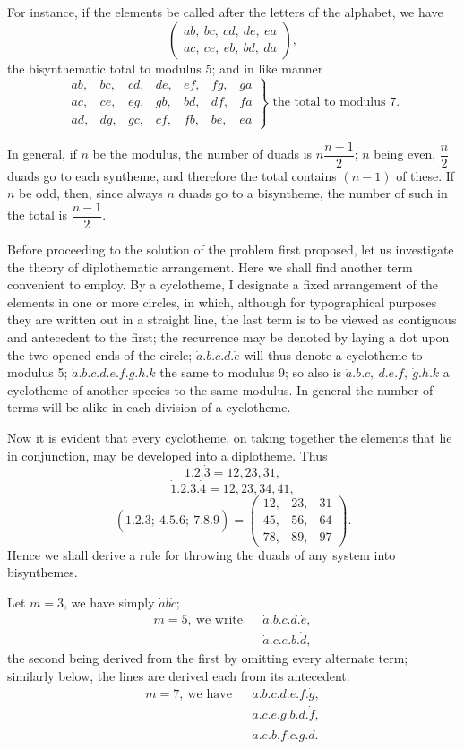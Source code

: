 \documentclass[11pt]{article}
\newcommand{\sourcepage}[1]{\marginpar{\scriptsize p.~#1}}
\newcommand{\dotter}[1]{\dot{#1}}
\newcommand{\tworow}[2]{\left(\begin{matrix}#1\\#2\end{matrix}\right)}
\begin{document}
For instance, if the elements be called after the letters of the alphabet, we have
\[
\tworow{ab,\ bc,\ cd,\ de,\ ea}{ac,\ ce,\ eb,\ bd,\ da},
\]
the bisynthematic total to modulus 5; and in like manner
\[
\left.\begin{array}{lllllll}
ab,&bc,&cd,&de,&ef,&fg,&ga\\
ac,&ce,&eg,&gb,&bd,&df,&fa\\
ad,&dg,&gc,&cf,&fb,&be,&ea
\end{array}\right\}\text{ the total to modulus }7.
\]

\sourcepage{93}
In general, if $n$ be the modulus, the number of duads is $n\dfrac{n-1}{2}$; $n$ being even, $\dfrac{n}{2}$ duads go to each syntheme, and therefore the total contains $(n-1)$ of these. If $n$ be odd, then, since always $n$ duads go to a bisyntheme, the number of such in the total is $\dfrac{n-1}{2}$.

Before proceeding to the solution of the problem first proposed, let us investigate the theory of diplothematic arrangement. Here we shall find another term convenient to employ. By a cyclotheme, I designate a fixed arrangement of the elements in one or more circles, in which, although for typographical purposes they are written out in a straight line, the last term is to be viewed as contiguous and antecedent to the first; the recurrence may be denoted by laying a dot upon the two opened ends of the circle; $\dotter a.b.c.d.\dotter e$ will thus denote a cyclotheme to modulus 5; $\dotter a.b.c.d.e.f.g.h.\dotter k$ the same to modulus 9; so also is $\dotter a.b.c,\ \dotter d.e.f,\ \dotter g.h.\dotter k$ a cyclotheme of another species to the same modulus. In general the number of terms will be alike in each division of a cyclotheme.

Now it is evident that every cyclotheme, on taking together the elements that lie in conjunction, may be developed into a diplotheme. Thus
\[
\dotter1.2.\dotter3 = 12,23,31,
\]
\[
\dotter1.2.3.\dotter4 = 12,23,34,41,
\]
\[
(\dotter1.2.\dotter3;\ \dotter4.5.\dotter6;\ \dotter7.8.\dotter9)
=
\left(\begin{array}{lll}
12,&23,&31\\
45,&56,&64\\
78,&89,&97
\end{array}\right).
\]
Hence we shall derive a rule for throwing the duads of any system into bisynthemes.

Let $m=3$, we have simply $\dotter a b\dotter c$;
\[
\begin{array}{rcl}
m=5,\ \text{we write}&& \dotter a.b.c.d.\dotter e,\\
&& \dotter a.c.e.b.\dotter d,
\end{array}
\]
the second being derived from the first by omitting every alternate term; similarly below, the lines are derived each from its antecedent.
\[
\begin{array}{rcl}
m=7,\ \text{we have}&& \dotter a.b.c.d.e.f.\dotter g,\\
&& \dotter a.c.e.g.b.d.\dotter f,\\
&& \dotter a.e.b.f.c.g.\dotter d.
\end{array}
\]
\end{document}
